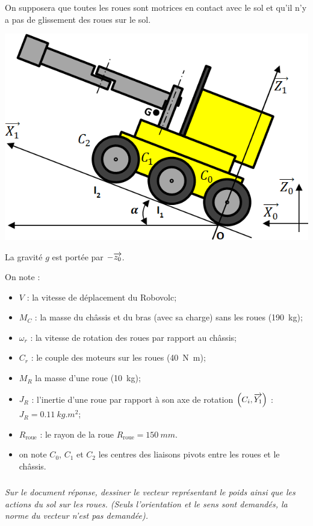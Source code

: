 \documentclass[10pt,fleqn]{article} %
\begin{document}
\begin{multicols}{2}
On supposera que toutes les roues sont motrices en contact avec le sol et qu'il n'y a pas de glissement des roues sur le sol.

\begin{center}
\includegraphics[width=\linewidth]{images/fig_07}
\end{center}


La gravité $g$ est portée par $-\overrightarrow{z_0}$.


On note :
\begin{itemize}
	\item $V$ : la vitesse de déplacement du Robovolc;
	\item $M_C$ : la masse du châssis et du bras (avec sa charge) sans les roues (\SI{190}{kg});
	\item $\omega_r$ : la vitesse de rotation des roues par rapport au châssis;
	\item $C_r$ : le couple des moteurs sur les roues (\SI{40}{N.m});
	\item $M_R$ la masse d'une roue (\SI{10}{kg});
	\item $J_R$  : l'inertie d'une roue par rapport à son axe de rotation $\left(C_i,\overrightarrow{Y_1}\right)$ :  $J_R=\SI{0,11}{kg.m^2}$;
	\item $R_{\text{roue}}$ : le rayon de la roue $R_{\text{roue}}=\SI{150}{mm}$.
	\item on note $C_0$, $C_1$ et $C_2$ les centres des liaisons pivots entre les roues et le châssis.
\end{itemize}



\subparagraph{}
\textit{Sur le document réponse, dessiner le vecteur représentant le poids ainsi que les actions du sol sur les roues. (Seuls l'orientation et le sens sont demandés, la norme du vecteur n'est pas demandée). }
\ifprof
\begin{corrige}
\end{corrige}
\else
\fi



\end{multicols}
\end{document}
